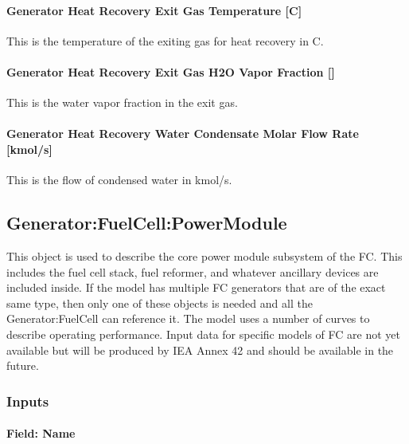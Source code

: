 \paragraph{Generator Heat Recovery Exit Gas Temperature {[}C{]}}\label{generator-heat-recovery-exit-gas-temperature-c}

This is the temperature of the exiting gas for heat recovery in C.

\paragraph{Generator Heat Recovery Exit Gas H2O Vapor Fraction {[]}}\label{generator-heat-recovery-exit-gas-h2o-vapor-fraction}

This is the water vapor fraction in the exit gas.

\paragraph{Generator Heat Recovery Water Condensate Molar Flow Rate {[}kmol/s{]}}\label{generator-heat-recovery-water-condensate-molar-flow-rate-kmols}

This is the flow of condensed water in kmol/s.

\subsection{Generator:FuelCell:PowerModule}\label{generatorfuelcellpowermodule}

This object is used to describe the core power module subsystem of the FC. This includes the fuel cell stack, fuel reformer, and whatever ancillary devices are included inside. If the model has multiple FC generators that are of the exact same type, then only one of these objects is needed and all the Generator:FuelCell can reference it. The model uses a number of curves to describe operating performance. Input data for specific models of FC are not yet available but will be produced by IEA Annex 42 and should be available in the future.

\subsubsection{Inputs}\label{inputs-13-003}

\paragraph{Field: Name}\label{field-name-14-001}

